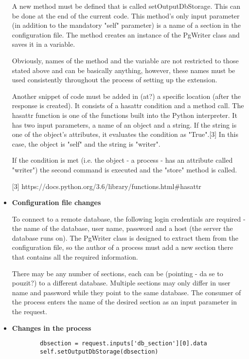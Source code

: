 \begin{itemize}
A new method must be defined that is called setOutputDbStorage. This can be done at the end of the current code. This method's only input parameter (in addition to the mandatory "self" parameter) is a name of a section in the configuration file. The method creates an instance of the PgWriter class and saves it in a variable.

Obviously, names of the method and the variable are not restricted to those stated above and can be basically anything, however, these names must be used consistently throughout the process of setting up the extension.

Another snippet of code must be added in (at?) a specific location (after the response is created). It consists of a hasattr condition and a method call. The hasattr function is one of the functions built into the Python interpreter. It has two input parameters, a name of an object and a string. If the string is one of the object's attributes, it evaluates the condition as "True".[3] In this case, the object is "self" and the string is "writer". 

If the condition is met (i.e. the object - a process - has an attribute called "writer") the second command is executed and the "store" method is called.

[3] https://docs.python.org/3.6/library/functions.html\#hasattr


\item \textbf{Configuration file changes}

To connect to a remote database, the following login credentials are required - the name of the database, user name, password and a host (the server the database runs on). The PgWriter class is designed to extract them from the configuration file, so the author of a process must add a new section there that contains all the required information. 

There may be any number of sections, each can be (pointing - da se to pouzit?) to a different database. Multiple sections may only differ in user name and password while they point to the same database. The consumer of the process enters the name of the desired section as an input parameter in the request. 

\item \textbf{Changes in the process}

\begin{verbatim}
        dbsection = request.inputs['db_section'][0].data
        self.setOutputDbStorage(dbsection)
\end{verbatim}
      
\end{itemize}

